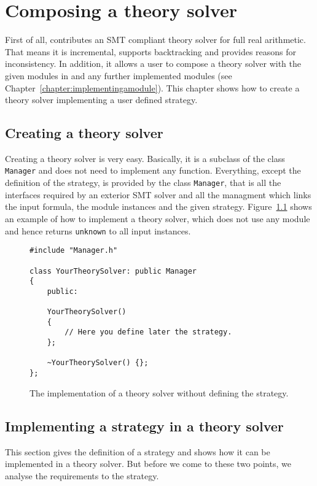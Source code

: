 \chapter{Composing a theory solver}
\label{chapter:composingats}
First of all, \smtrat contributes an SMT compliant theory solver for full real arithmetic.
That means it is incremental, supports backtracking and provides reasons for inconsistency.
In addition, it allows a user to compose a theory solver with the given modules in \smtrat
and any further implemented modules (see Chapter~\ref{chapter:implementingamodule}).
This chapter shows how to create a theory solver implementing a user defined strategy.

\section{Creating a theory solver}
Creating a theory solver is very easy. Basically, it is a subclass of the class \texttt{Manager} and
does not need to implement any function. Everything, except the definition of the strategy, is provided by
the class \texttt{Manager}, that is all the interfaces required by an exterior SMT solver and all
the managment which links the input formula, the module instances and the given strategy.
Figure~\ref{fig:tsconstructor} shows an example of how to implement a theory solver, which does
not use any module and hence returns \texttt{unknown} to all input instances.

\begin{figure}[htb]
\caption{The implementation of a theory solver without defining the strategy.}
\label{fig:tsconstructor}
\begin{verbatim}
#include "Manager.h"

class YourTheorySolver: public Manager
{
    public:
    
    YourTheorySolver()
    {
    	// Here you define later the strategy.
    };
    
    ~YourTheorySolver() {};
};
\end{verbatim}
\end{figure}

\section{Implementing a strategy in a theory solver}
This section gives the definition of a strategy and shows how it can be implemented
in a theory solver. But before we come to these two points, we analyse the requirements
to the strategy.

